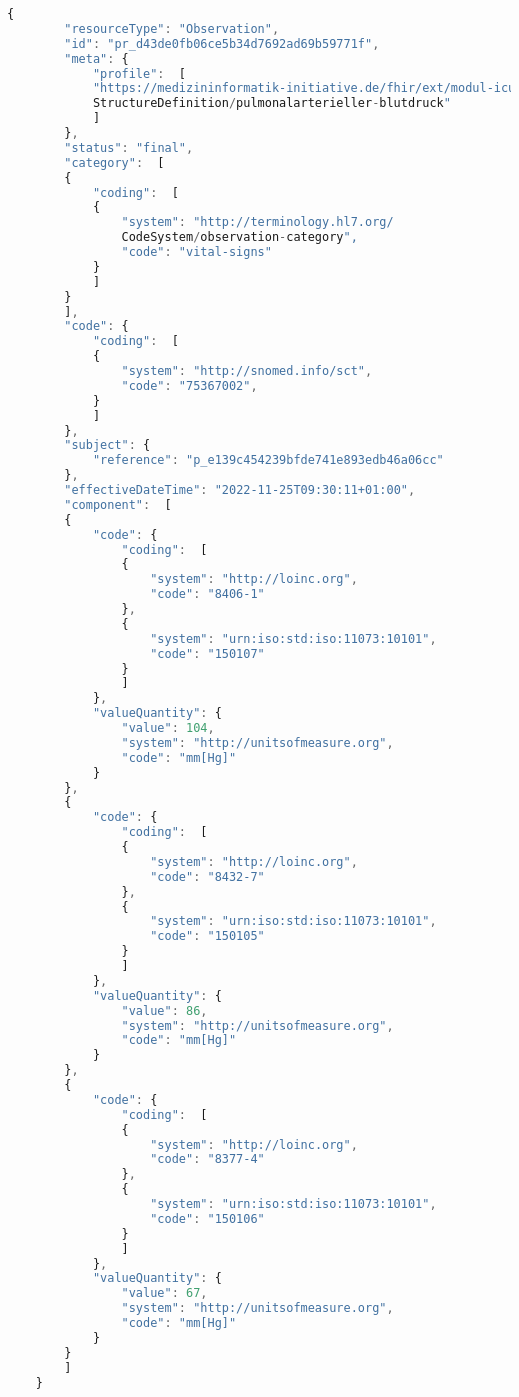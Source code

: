 \begin{lstlisting}[caption={[Beispiel einer \acs{fhir}-Ressource aus \acs{copra}] Beispiel einer \acs{fhir}-Ressource einer Blutdruckmessung aus \acs{copra}.},language=JavaScript, label=list:fhirres, captionpos=b]
	{
		"resourceType": "Observation",
		"id": "pr_d43de0fb06ce5b34d7692ad69b59771f",
		"meta": {
			"profile":  [
			"https://medizininformatik-initiative.de/fhir/ext/modul-icu/
			StructureDefinition/pulmonalarterieller-blutdruck"
			]
		},
		"status": "final",
		"category":  [
		{
			"coding":  [
			{
				"system": "http://terminology.hl7.org/
				CodeSystem/observation-category",
				"code": "vital-signs"
			}
			]
		}
		],
		"code": {
			"coding":  [
			{
				"system": "http://snomed.info/sct",
				"code": "75367002",
			}
			]
		},
		"subject": {
			"reference": "p_e139c454239bfde741e893edb46a06cc"
		},
		"effectiveDateTime": "2022-11-25T09:30:11+01:00",
		"component":  [
		{
			"code": {
				"coding":  [
				{
					"system": "http://loinc.org",
					"code": "8406-1"
				},
				{
					"system": "urn:iso:std:iso:11073:10101",
					"code": "150107"
				}
				]
			},
			"valueQuantity": {
				"value": 104,
				"system": "http://unitsofmeasure.org",
				"code": "mm[Hg]"
			}
		},
		{
			"code": {
				"coding":  [
				{
					"system": "http://loinc.org",
					"code": "8432-7"
				},
				{
					"system": "urn:iso:std:iso:11073:10101",
					"code": "150105"
				}
				]
			},
			"valueQuantity": {
				"value": 86,
				"system": "http://unitsofmeasure.org",
				"code": "mm[Hg]"
			}
		},
		{
			"code": {
				"coding":  [
				{
					"system": "http://loinc.org",
					"code": "8377-4"
				},
				{
					"system": "urn:iso:std:iso:11073:10101",
					"code": "150106"
				}
				]
			},
			"valueQuantity": {
				"value": 67,
				"system": "http://unitsofmeasure.org",
				"code": "mm[Hg]"
			}
		}
		]
	}
\end{lstlisting}